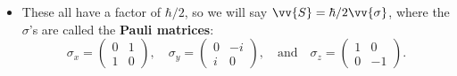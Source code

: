 \begin{itemize}
\begin{equation}
        \end{equation}
    \item These all have a factor of $\hbar/2$, so we will say $\vv{S} = \hbar/2 \vv{\sigma}$, where the $\sigma$'s are called the \textbf{Pauli matrices}:
        \begin{equation}
            \sigma_x = \begin{pmatrix}0 & 1 \\ 1 & 0\end{pmatrix}, \quad \sigma_y = \begin{pmatrix}0 & -i \\ i & 0\end{pmatrix}, \quad\mathrm{and}\quad \sigma_z = \begin{pmatrix}1 & 0 \\ 0 & -1\end{pmatrix}.
        \end{equation}
\end{itemize}
